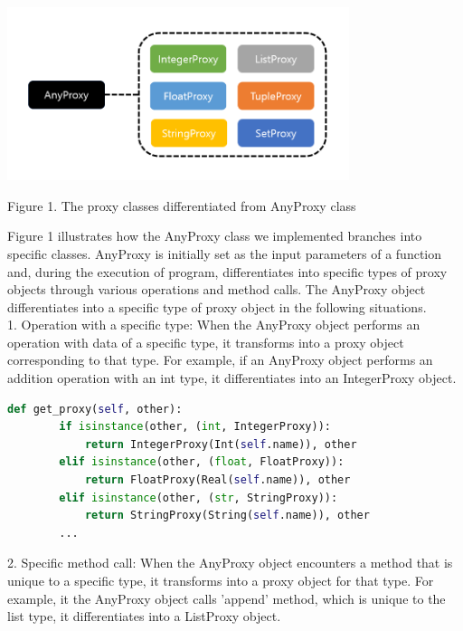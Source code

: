 \documentclass[11pt]{article}
\begin{document}
\begin{center}
\includegraphics[width = 10cm]{images/Anyproxy_to_proxies.PNG}

{Figure 1. The proxy classes differentiated from AnyProxy class}
\end{center}

Figure 1 illustrates how the AnyProxy class we implemented branches into specific classes. AnyProxy is initially set as the input parameters of a function and, during the execution of program, differentiates into specific types of proxy objects through various operations and method calls. The AnyProxy object differentiates into a specific type of proxy object in the following situations. \\

1. Operation with a specific type: When the AnyProxy object performs an operation with data of a specific type, it transforms into a proxy object corresponding to that type. For example, if an AnyProxy object performs an addition operation with an int type, it differentiates into an IntegerProxy object. \\

\begin{lstlisting}[language=python]
def get_proxy(self, other):
        if isinstance(other, (int, IntegerProxy)):
            return IntegerProxy(Int(self.name)), other
        elif isinstance(other, (float, FloatProxy)):
            return FloatProxy(Real(self.name)), other
        elif isinstance(other, (str, StringProxy)):
            return StringProxy(String(self.name)), other
        ...
\end{lstlisting}

2. Specific method call: When the AnyProxy object encounters a method that is unique to a specific type, it transforms into a proxy object for that type. For example, it the AnyProxy object calls 'append' method, which is unique to the list type, it differentiates into a ListProxy object. \\
\end{document}
